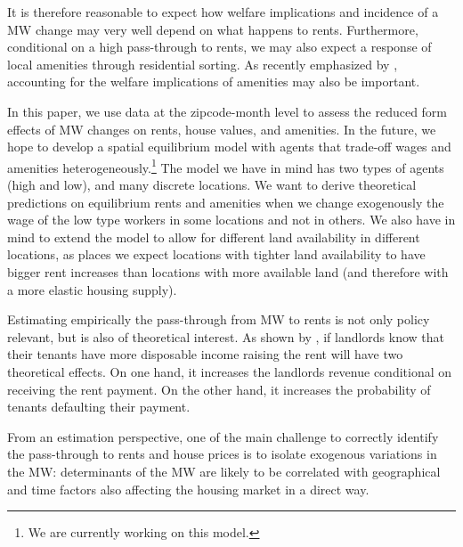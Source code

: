  
 It is therefore reasonable to expect how welfare implications and incidence of a MW change may very well depend on what happens to rents. Furthermore, conditional on a high pass-through to rents, we may also expect a response of local amenities through residential sorting. As recently emphasized by \textcite{diamond2016determinants}, accounting for the welfare implications of amenities may also be important.
 
 In this paper, we use data at the zipcode-month level to assess the reduced form effects of MW changes on rents, house values, and amenities. In the future, we hope to develop a spatial equilibrium model with agents that trade-off wages and amenities heterogeneously.\footnote{We are currently working on this model.} The model we have in mind has two types of agents (high and low), and many discrete locations. We want to derive theoretical predictions on equilibrium rents and amenities when we change exogenously the wage of the low type workers in some locations and not in others. We also have in mind to extend the model to allow for different land availability in different locations, as places we expect locations with tighter land availability to have bigger rent increases than locations with more available land (and therefore with a more elastic housing supply). 

Estimating empirically the pass-through from MW to rents is not only policy relevant, but is also of theoretical interest. As shown by \textcite{agarwal2019minimum}, if landlords know that their tenants have more disposable income raising the rent will have two theoretical effects. On one hand, it increases the landlords revenue conditional on receiving the rent payment. On the other hand, it increases the probability of tenants defaulting their payment. 

From an estimation perspective, one of the main challenge to correctly identify the pass-through to rents and house prices is to isolate exogenous variations in the MW: determinants of the MW are likely to be correlated with geographical and time factors also affecting the housing market in a direct way. 
 

